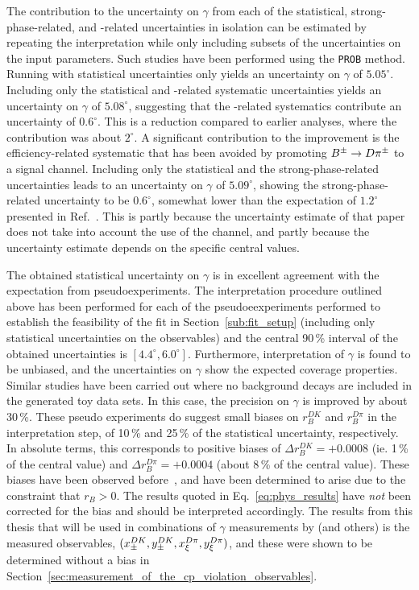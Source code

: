 The contribution to the uncertainty on $\gamma$ from each of the statistical, strong-phase-related, and \lhcb-related uncertainties in isolation can be estimated by repeating the interpretation while only including subsets of the uncertainties on the input parameters. Such studies have been performed using the \texttt{PROB} method. Running with statistical uncertainties only yields an uncertainty on $\gamma$ of $5.05^\circ$. Including only the statistical and \lhcb-related systematic uncertainties yields an uncertainty on $\gamma$ of $5.08^\circ$, suggesting that the \lhcb-related systematics  contribute an uncertainty of $0.6^\circ$. This is a reduction compared to earlier analyses, where the contribution was about $2^\circ$. A significant contribution to the improvement is the efficiency-related systematic that has been avoided by promoting ${{{B}^\pm}\rightarrow{\ensuremath{D}}{\ensuremath{{\pi}^\pm}}}$ to a signal channel. Including only the statistical and the strong-phase-related uncertainties leads to an uncertainty on $\gamma$ of $5.09^\circ$, showing the strong-phase-related uncertainty to be $0.6^\circ$, somewhat lower than the expectation of $1.2^\circ$  presented in Ref.~\cite{BESCISI}. This is partly because the uncertainty estimate of that paper does not take into account the use of the \DtoKsKK channel, and partly because the uncertainty estimate depends on the specific central values.

The obtained statistical uncertainty on $\gamma$ is in excellent agreement with the expectation from pseudoexperiments. The interpretation procedure outlined above has been performed for each of the pseudoeexperiments performed to establish the feasibility of the \CP fit in Section~\ref{sub:fit_setup} (including only statistical uncertainties on the observables) and the central 90\,\% interval of the obtained uncertainties is $[4.4^\circ, 6.0^\circ]$. Furthermore, interpretation of $\gamma$ is found to be unbiased, and the uncertainties on $\gamma$ show the expected coverage properties. Similar studies have been carried out where no background decays are included in the generated toy data sets. In this case, the precision on $\gamma$ is improved by about 30\,\%. These pseudo experiments do suggest small biases on $r_B^{DK}$ and $r_B^{D\pi}$ in the interpretation step, of 10\,\% and 25\,\% of the statistical uncertainty, respectively. In absolute terms, this corresponds to positive biases of $\Delta r_B^{DK} = +0.0008$ (ie. 1\,\% of the central value) and $\Delta r_B^{D\pi} = +0.0004$ (about 8\,\% of the central value). These biases have been observed before~\cite{LHCb-PAPER-2016-032}, and have been determined to arise due to the constraint that $r_B>0$.  The results quoted in Eq.~\eqref{eq:phys_results} have \emph{not} been corrected for the bias and should be interpreted accordingly. The results from this thesis that will be used in combinations of $\gamma$ measurements by \lhcb (and others) is the measured observables, $(x_\pm^{{D}{K}}, y_\pm^{{D}{K}}, x_\xi^{{D}\pi}, y_\xi^{{D}\pi})$,  and these were shown to be determined without a bias in Section~\ref{sec:measurement_of_the_cp_violation_observables}.

